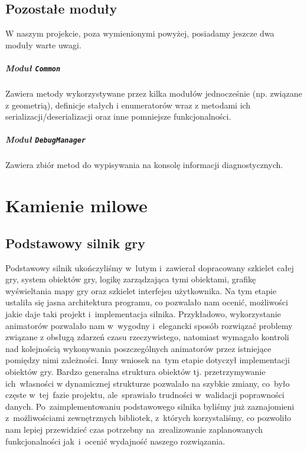 \documentclass[licencjacka]{pracamgr}
\begin{document}
  \section{Pozostałe moduły}
    W naszym projekcie, poza wymienionymi powyżej, posiadamy jeszcze dwa moduły warte uwagi.
    \paragraph{Moduł \texttt{Common}}
      Zawiera metody wykorzystywane przez kilka modułów jednocześnie (np. związane z geometrią), definicje stałych i enumeratorów
      wraz z metodami ich serializacji/deserializacji oraz inne pomniejsze funkcjonalności.
    \paragraph{Moduł \texttt{DebugManager}}
      Zawiera zbiór metod do wypisywania na konsolę informacji diagnostycznych.

  \chapter{Kamienie milowe}
    \section{Podstawowy silnik gry}
    Podstawowy silnik ukończyliśmy w~lutym i~zawierał dopracowany szkielet całej gry, system obiektów gry,
    logikę zarządzająca tymi obiektami, grafikę wyświeltania mapy gry oraz szkielet interfejsu użytkownika.
    Na tym etapie ustaliła się jasna architektura programu, co pozwalało nam ocenić, możliwości jakie
    daje taki projekt i~implementacja silnika. Przykładowo, wykorzystanie animatorów pozwalało nam w~wygodny
    i~elegancki sposób rozwiązać problemy związane z obsługą zdarzeń czasu rzeczywistego, natomiast wymagało kontroli
    nad kolejnością wykonywania poszczególnych animatorów przez istniejące pomiędzy nimi zależności. Inny wniosek
    na~tym etapie dotyczył implementacji obiektów gry. Bardzo generalna struktura obiektów tj. przetrzymywanie
    ich~własności w dynamicznej strukturze pozwalało na szybkie zmiany, co~było częste w~tej~fazie projektu,
    ale~sprawiało trudności w~walidacji poprawności danych.
    Po~zaimplementowaniu podstawowego silnika byliśmy już zaznajomieni z~możliwościami zewnętrznych bibliotek,
    z~których korzystaliśmy, co pozwoliło nam lepiej przewidzieć czas potrzebny na~zrealizowanie zaplanowanych
    funkcjonalności jak~i~ocenić wydajność naszego rozwiązania.
\end{document}
